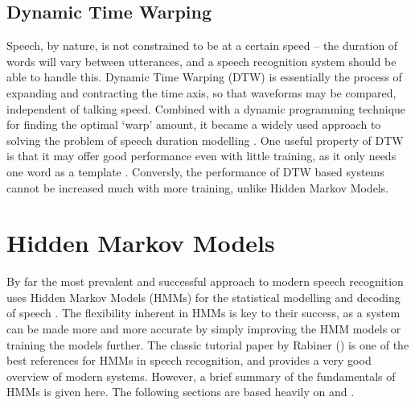 	\subsection{Dynamic Time Warping} %
		\label{sub:dynamic_time_warping}
		Speech, by nature, is not constrained to be at a certain speed -- the duration of words will vary between utterances, and a speech recognition system should be able to handle this.  Dynamic Time Warping (DTW) is essentially the process of expanding and contracting the time axis, so that waveforms may be compared, independent of talking speed.  Combined with a dynamic programming technique for finding the optimal `warp' amount, it became a widely used approach to solving the problem of speech duration modelling \cite{furui1989speech}.  One useful property of DTW is that it may offer good performance even with little training, as it only needs one word as a template \cite{melnikoff2003speech}.  Conversly, the performance of DTW based systems cannot be increased much with more training, unlike Hidden Markov Models.

\section{Hidden Markov Models} %
\label{sec:about_hmms}
	By far the most prevalent and successful approach to modern speech recognition uses Hidden Markov Models (HMMs) for the statistical modelling and decoding of speech \cite{cox1988hidden}.  The flexibility inherent in HMMs is key to their success, as a system can be made more and more accurate by simply improving the HMM models or training the models further.  The classic tutorial paper by Rabiner (\cite{rabiner1989tutorial}) is one of the best references for HMMs in speech recognition, and provides a very good overview of modern systems.  However, a brief summary of the fundamentals of HMMs is given here. The following sections are based heavily on \cite{rabiner1989tutorial} and \cite{htkbook}.

